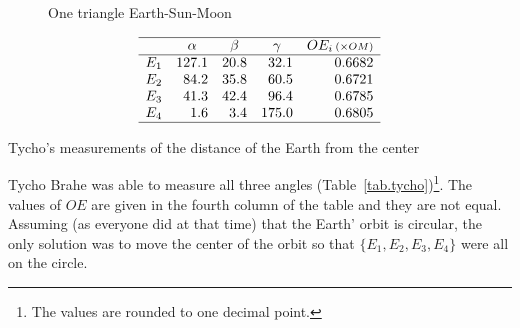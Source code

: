 \begin{figure}[t]
\begin{center}
\caption{One triangle Earth-Sun-Moon}\label{f.kepler-one-triangle}
\end{center}
\end{figure}


\begin{table}[b]
\[
\begin{array}{rrrrr}
\hline
& \multicolumn{1}{c}{\alpha} & \multicolumn{1}{c}{\beta} &
  \multicolumn{1}{c}{\gamma} & \multicolumn{1}{c}{OE_i \,\scriptstyle(\times OM)} \\\hline
E_1 & 127.1 & 20.8  & 32.1 & 0.6682\\
E_2 & 84.2 & 35.8 & 60.5 & 0.6721\\
E_3 & 41.3 & 42.4 &96.4 & 0.6785\\
E_4 & 1.6& 3.4& 175.0 & 0.6805\\
\hline
\end{array}
\]
\caption{Tycho's measurements of the distance of the Earth from the center}\label{tab.tycho}
\end{table}


Tycho Brahe was able to measure all three angles (Table~\ref{tab.tycho})\footnote{The values are rounded to one decimal point.}. The values of $OE$ are given in the fourth column of the table and they are not equal. Assuming (as everyone did at that time) that the Earth' orbit is circular, the only solution was to move the center of the orbit so that $\{E_1,E_2,E_3,E_4\}$ were all on the circle.

